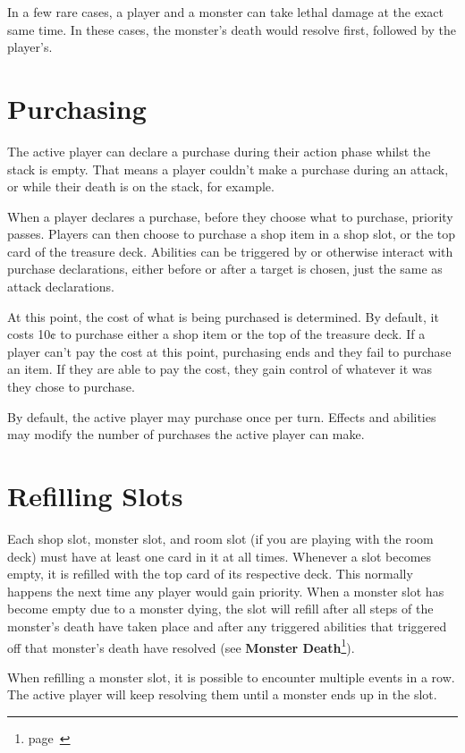 \documentclass[
  fontsize=10pt,
  paper=a5,
  version=last,
  chapterprefix=true,
  bindingoffset=5mm,
  ]{scrbook}
\begin{document}
    In a few rare cases, a player and a monster can take lethal damage at the exact same time. In these cases, the monster’s death would resolve first, followed by the player’s.


    \chapter{Purchasing}
    \label{purchasing}
    The active player can declare a purchase during their action phase whilst the stack is empty. That means a player couldn’t make a purchase during an attack, or while their death is on the stack, for example.

    When a player declares a purchase, before they choose what to purchase, priority passes. Players can then choose to purchase a shop item in a shop slot, or the top card of the treasure deck. Abilities can be triggered by or otherwise interact with purchase declarations, either before or after a target is chosen, just the same as attack declarations.

    At this point, the cost of what is being purchased is determined. By default, it costs 10¢ to purchase either a shop item or the top of the treasure deck. If a player can’t pay the cost at this point, purchasing ends and they fail to purchase an item. If they are able to pay the cost, they gain control of whatever it was they chose to purchase.

    By default, the active player may purchase once per turn. Effects and abilities may modify the number of purchases the active player can make.

    \chapter{Refilling Slots}
    \label{refilling}
    Each shop slot, monster slot, and room slot (if you are playing with the room deck) must have at least one card in it at all times. Whenever a slot becomes empty, it is refilled with the top card of its respective deck. This normally happens the next time any player would gain priority. When a monster slot has become empty due to a monster dying, the slot will refill after all steps of the monster’s death have taken place and after any triggered abilities that triggered off that monster’s death have resolved (see \textbf{Monster Death}\footnote{page~\pageref{monsterdeath}}).

    When refilling a monster slot, it is possible to encounter multiple events in a row. The active player will keep resolving them until a monster ends up in the slot.
\end{document}
